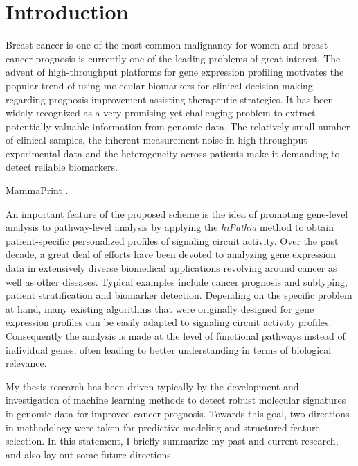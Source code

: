 \chapter{Introduction}
\label{chap:intro}

Breast cancer is one of the most common malignancy for women and breast cancer prognosis is currently one of the leading problems of great interest. The advent of high-throughput platforms for gene expression profiling motivates the popular trend of using molecular biomarkers for clinical decision making regarding prognosis improvement assisting therapeutic strategies. It has been widely recognized as a very promising yet challenging problem to extract potentially valuable information from genomic data. The relatively small number of clinical samples, the inherent measurement noise in high-throughput experimental data and the heterogeneity across patients make it demanding to detect reliable biomarkers.

MammaPrint \cite{VantVeer2008Enabling}.

An important feature of the proposed scheme is the idea of promoting gene-level analysis to pathway-level analysis by applying the \textit{hiPathia} method to obtain patient-specific personalized profiles of signaling circuit activity. Over the past decade, a great deal of efforts have been devoted to analyzing gene expression data in extensively diverse biomedical applications revolving around cancer as well as other diseases. Typical examples include cancer prognosis and subtyping, patient stratification and biomarker detection. Depending on the specific problem at hand, many existing algorithms that were originally designed for gene expression profiles can be easily adapted to signaling circuit activity profiles. Consequently the analysis is made at the level of functional pathways instead of individual genes, often leading to better understanding in terms of biological relevance.

My thesis research has been driven typically by the development and investigation of machine learning methods to detect robust molecular signatures in genomic data for improved cancer prognosis. Towards this goal, two directions in methodology were taken for predictive modeling and structured feature selection. In this statement, I briefly summarize my past and current research, and also lay out some future directions.

